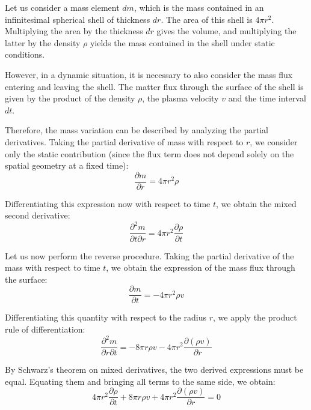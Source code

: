 Let us consider a mass element $dm$, which is the mass contained in an infinitesimal spherical shell of thickness $dr$. The area of this shell is $4\pi r^2$. Multiplying the area by the thickness $dr$ gives the volume, and multiplying the latter by the density $\rho$ yields the mass contained in the shell under static conditions.

However, in a dynamic situation, it is necessary to also consider the mass flux entering and leaving the shell. The matter flux through the surface of the shell is given by the product of the density $\rho$, the plasma velocity $v$ and the time interval $dt$.

Therefore, the mass variation can be described by analyzing the partial derivatives.
Taking the partial derivative of mass with respect to $r$, we consider only the static contribution (since the flux term does not depend solely on the spatial geometry at a fixed time):
\begin{equation}
\frac{\partial m}{\partial r} = 4\pi r^2 \rho
\end{equation}

Differentiating this expression now with respect to time $t$, we obtain the mixed second derivative:
\begin{equation}
\frac{\partial^2 m}{\partial t \partial r} = 4\pi r^2 \frac{\partial \rho}{\partial t}
\end{equation}

Let us now perform the reverse procedure. Taking the partial derivative of the mass with respect to time $t$, we obtain the expression of the mass flux through the surface:
\begin{equation}
\frac{\partial m}{\partial t} = -4\pi r^2 \rho v
\end{equation}

Differentiating this quantity with respect to the radius $r$, we apply the product rule of differentiation:
\begin{equation}
\frac{\partial^2 m}{\partial r \partial t} = -8\pi r \rho v - 4\pi r^2 \frac{\partial (\rho v)}{\partial r}
\end{equation}

By Schwarz's theorem on mixed derivatives, the two derived expressions must be equal. Equating them and bringing all terms to the same side, we obtain:
\begin{equation}
4\pi r^2 \frac{\partial \rho}{\partial t} + 8\pi r \rho v + 4\pi r^2 \frac{\partial (\rho v)}{\partial r} = 0
\end{equation}

